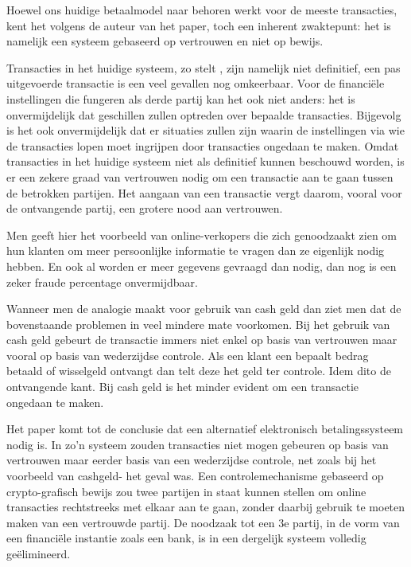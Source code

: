 			Hoewel ons huidige betaalmodel naar behoren werkt voor de meeste transacties, kent het volgens de auteur van het paper, toch een inherent zwaktepunt: het is namelijk een systeem gebaseerd op vertrouwen en niet op bewijs.
			
			Transacties in het huidige systeem, zo stelt \textcite{Nakamoto2008}, zijn namelijk niet definitief, een pas uitgevoerde transactie is een veel gevallen nog omkeerbaar. Voor de financiële instellingen die fungeren als derde partij kan het ook niet anders: het is onvermijdelijk dat geschillen zullen optreden over bepaalde transacties. Bijgevolg is het ook onvermijdelijk dat er situaties zullen zijn waarin de instellingen via wie de transacties lopen moet ingrijpen door transacties ongedaan te maken. Omdat transacties in het huidige systeem niet als definitief kunnen beschouwd worden, is er een zekere graad van vertrouwen nodig om een transactie aan te gaan tussen de betrokken partijen.  Het aangaan van een transactie vergt daarom, vooral voor de ontvangende partij, een grotere nood aan vertrouwen. 
			
			Men geeft hier het voorbeeld van online-verkopers die zich genoodzaakt zien om hun klanten om meer persoonlijke informatie te vragen dan ze eigenlijk nodig hebben. En ook al worden er meer gegevens gevraagd dan nodig, dan nog is een zeker fraude percentage onvermijdbaar. 
		
			Wanneer men de analogie maakt voor gebruik van cash geld dan ziet men dat de bovenstaande problemen in veel mindere mate voorkomen. Bij het gebruik van cash geld gebeurt de transactie immers niet enkel op basis van vertrouwen maar vooral op basis van wederzijdse controle. Als een klant een bepaalt bedrag betaald of wisselgeld ontvangt dan telt deze het geld ter controle. Idem dito de ontvangende kant. Bij cash geld is het minder evident om een transactie ongedaan te maken. 
			
			Het paper komt tot de conclusie dat een alternatief elektronisch betalingssysteem nodig is. In zo’n systeem zouden transacties niet mogen gebeuren op basis van vertrouwen maar eerder basis van een wederzijdse controle, net zoals bij het voorbeeld van cashgeld- het geval was. Een controlemechanisme gebaseerd op crypto-grafisch bewijs zou twee partijen in staat kunnen stellen om online transacties rechtstreeks met elkaar aan te gaan, zonder daarbij gebruik te moeten maken van een vertrouwde partij. De noodzaak tot een 3e partij, in de vorm van een financiële instantie zoals een bank, is in een dergelijk systeem volledig geëlimineerd.
		
